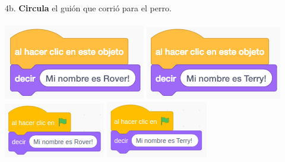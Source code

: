 \documentclass[letterpaper,12pt]{article}
\begin{document}
\noindent 4b. \textbf{Circula} el guión que corrió para el perro. \\ \\
\includegraphics[scale=.5,valign=t]{q4_script0.png} \hspace{.5cm}
\includegraphics[scale=.5,valign=t]{q4_script1.png} \hspace{.5cm}
\includegraphics[scale=.7,valign=t]{q4_script2.png} \hspace{.5cm}
\includegraphics[scale=.7,valign=t]{q4_script3.png} \hspace{.5cm}
\vspace{.5cm}

\noindent \dotfill
\end{document}
